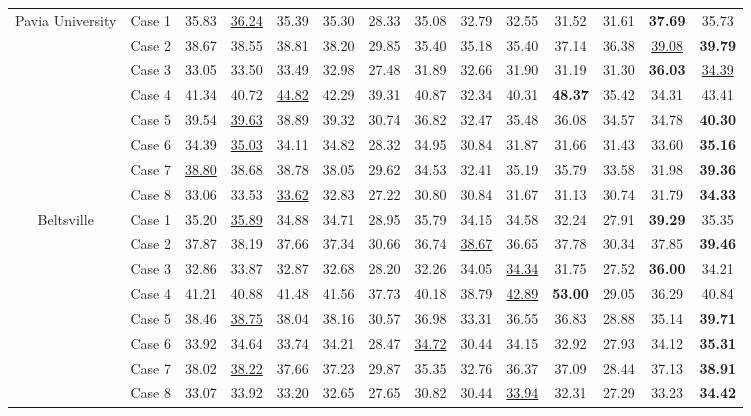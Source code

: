 \begin{table*}[t]
\begin{center}
{\begin{tabular}{cc cccccccccccc}
				\multirow{8}{*}{Pavia University} 
				& Case 1 & 
				35.83 & \underline{36.24} & 35.39 & 35.30 & 28.33 & 35.08 & 32.79 & 32.55 & 31.52 & 31.61 & \textbf{37.69} & 35.73 \\ 
				& Case 2 & 
				38.67 & 38.55 & 38.81 & 38.20 & 29.85 & 35.40 & 35.18 & 35.40 & 37.14 & 36.38 & \underline{39.08} & \textbf{39.79} \\ 
				& Case 3 & 
				33.05 & 33.50 & 33.49 & 32.98 & 27.48 & 31.89 & 32.66 & 31.90 & 31.19 & 31.30 & \textbf{36.03} & \underline{34.39} \\ 
				& Case 4 & 
				41.34 & 40.72 & \underline{44.82} & 42.29 & 39.31 & 40.87 & 32.34 & 40.31 & \textbf{48.37} & 35.42 & 34.31 & 43.41 \\ 
				& Case 5 & 
				39.54 & \underline{39.63} & 38.89 & 39.32 & 30.74 & 36.82 & 32.47 & 35.48 & 36.08 & 34.57 & 34.78 & \textbf{40.30} \\ 
				& Case 6 & 
				34.39 & \underline{35.03} & 34.11 & 34.82 & 28.32 & 34.95 & 30.84 & 31.87 & 31.66 & 31.43 & 33.60 & \textbf{35.16} \\ 
				& Case 7 & 
				\underline{38.80} & 38.68 & 38.78 & 38.05 & 29.62 & 34.53 & 32.41 & 35.19 & 35.79 & 33.58 & 31.98 & \textbf{39.36} \\ 
				& Case 8 & 
				33.06 & 33.53 & \underline{33.62} & 32.83 & 27.22 & 30.80 & 30.84 & 31.67 & 31.13 & 30.74 & 31.79 & \textbf{34.33} \\ 

				\cmidrule(lr){1-14} 

				\multirow{8}{*}{Beltsville} 
				& Case 1 & 
				35.20 & \underline{35.89} & 34.88 & 34.71 & 28.95 & 35.79 & 34.15 & 34.58 & 32.24 & 27.91 & \textbf{39.29} & 35.35 \\ 
				& Case 2 & 
				37.87 & 38.19 & 37.66 & 37.34 & 30.66 & 36.74 & \underline{38.67} & 36.65 & 37.78 & 30.34 & 37.85 & \textbf{39.46} \\ 
				& Case 3 & 
				32.86 & 33.87 & 32.87 & 32.68 & 28.20 & 32.26 & 34.05 & \underline{34.34} & 31.75 & 27.52 & \textbf{36.00} & 34.21 \\ 
				& Case 4 & 
				41.21 & 40.88 & 41.48 & 41.56 & 37.73 & 40.18 & 38.79 & \underline{42.89} & \textbf{53.00} & 29.05 & 36.29 & 40.84 \\ 
				& Case 5 & 
				38.46 & \underline{38.75} & 38.04 & 38.16 & 30.57 & 36.98 & 33.31 & 36.55 & 36.83 & 28.88 & 35.14 & \textbf{39.71} \\ 
				& Case 6 & 
				33.92 & 34.64 & 33.74 & 34.21 & 28.47 & \underline{34.72} & 30.44 & 34.15 & 32.92 & 27.93 & 34.12 & \textbf{35.31} \\ 
				& Case 7 & 
				38.02 & \underline{38.22} & 37.66 & 37.23 & 29.87 & 35.35 & 32.76 & 36.37 & 37.09 & 28.44 & 37.13 & \textbf{38.91} \\ 
				& Case 8 & 
				33.07 & 33.92 & 33.20 & 32.65 & 27.65 & 30.82 & 30.44 & \underline{33.94} & 32.31 & 27.29 & 33.23 & \textbf{34.42} \\ 

				\bottomrule
			\end{tabular}
		}
	\end{center}
\end{table*}